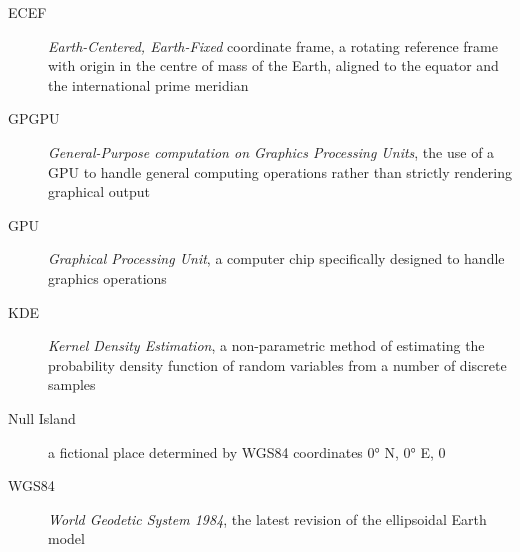 \begin{description}
    \item[ECEF]
        \emph{Earth-Centered, Earth-Fixed} coordinate frame, a rotating reference frame with origin
        in the centre of mass of the Earth, aligned to the equator and the international prime meridian \cite{ecef}
    \item[GPGPU]
        \emph{General-Purpose computation on Graphics Processing Units},
        the use of a GPU to handle general computing operations rather than strictly rendering graphical output \cite{gpgpu}
    \item[GPU]
        \emph{Graphical Processing Unit}, a computer chip specifically designed to handle graphics operations \cite{gpu}
    \item[KDE]
        \emph{Kernel Density Estimation}, a non-parametric method of estimating the probability density function
        of random variables from a number of discrete samples \cite{kde}
    \item[Null Island]
        a fictional place determined by WGS84 coordinates \ang{0} N, \ang{0} E, \SI{0}{\metres} \cite{null-island}
    \item[WGS84]
        \emph{World Geodetic System 1984}, the latest revision of the ellipsoidal Earth model
\end{description}
